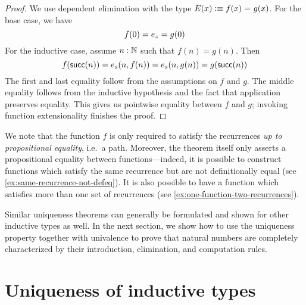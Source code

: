 \begin{proof}
We use dependent elimination with the type $E(x) \vcentcolon\equiv f(x) =_{} g(x)$. For the base case, we have \[f(0) = e_z = g(0)\]
For the inductive case, assume $n : \mathbb{N}$ such that $f(n) = g(n)$. Then
\[ f(\mathsf{succ}(n)) = e_s(n, f(n)) = e_s(n, g(n)) = g(\mathsf{succ}(n)) \]
The first and last equality follow from the assumptions on $f$ and $g$. The middle equality follows from the inductive hypothesis and the fact that application preserves equality. This gives us pointwise equality between $f$ and $g$; invoking function extensionality finishes the proof.
\end{proof}
We note that the function $f$ is only required to satisfy the recurrences \emph{up to propositional equality}, i.e.\ a path.
Moreover, the theorem itself only asserts a propositional equality between functions---indeed, it is possible to construct functions which satisfy the same recurrence but are not definitionally equal (see \autoref{ex:same-recurrence-not-defeq}).
It is also possible to have a function which satisfies more than one set of recurrences (see \autoref{ex:one-function-two-recurrences}).

Similar uniqueness theorems can generally be formulated and shown for other inductive types as well. In the next section, we show how to use the uniqueness property together with univalence to prove that natural numbers are completely characterized by their introduction, elimination, and computation rules.



\section{Uniqueness of inductive types}
\label{sec:appetizer-univalence}

\newcommand{\natp}{\ensuremath{\nat'}\xspace}
\newcommand{\zp}{\ensuremath{0'}\xspace}
\newcommand{\Sp}{\ensuremath{\suc'}\xspace}
\newcommand{\dblp}{\ensuremath{\dbl'}\xspace}

